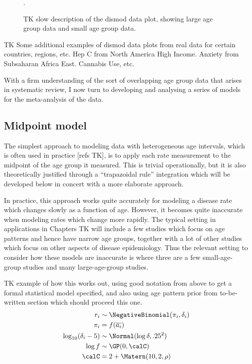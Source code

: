 \begin{figure}[ht]
\caption{TK slow description of the dismod data plot,
showing large age group data and small age group data.}
\label{theory-age_group_model-dismod_data_plot}.
\end{figure}

TK Some additional examples of dismod data plots from real data for
certain countries, regions, etc. Hep C from North America High
Income. Anxiety from Subsaharan Africa East.  Cannabis Use, etc.

With a firm understanding of the sort of overlapping age group data
that arises in systematic review, I now turn to developing and
analysing a series of models for the meta-analysis of the data.

\subsection{Midpoint model}
The simplest approach to modeling data with heterogeneous age
intervals, which is often used in practice [refs TK], is to apply each
rate measurement to the midpoint of the age group it measured.  This
is trivial operationally, but it is also theoretically justified
through a ``trapazoidal rule'' integration which will be developed
below in concert with a more elaborate approach.

In practice, this approach works quite accurately for modeling a
disease rate which changes slowly as a function of age.  However, it
becomes quite inaccurate when modeling rates which change more
rapidly.  The typical setting in applications in Chapters TK
will include a few studies which focus on age patterns and hence have
narrow age groups, together with a lot of other studies which focus on
other aspects of disease epidemiology.  Thus the relevant setting to
consider how these models are inaccurate is where three are a few
small-age-group studies and many large-age-group studies.

TK example of how this works out, using good notation from above to
get a formal statistical model specified, and also using age pattern
prior from to-be-written section which should proceed this one.
\begin{align*}
r_i &\sim \NegativeBinomial(\pi_i, \delta_i)\\
\pi_i &= f(\overline{a_i})\\
\log_{10}(\delta_i - 5) &\sim \Normal(\log\delta, .25^2)\\
\log f &\sim \GP(0, \calC)\\
\calC &= 2 + \Matern(10, 2, \rho)
\end{align*}

